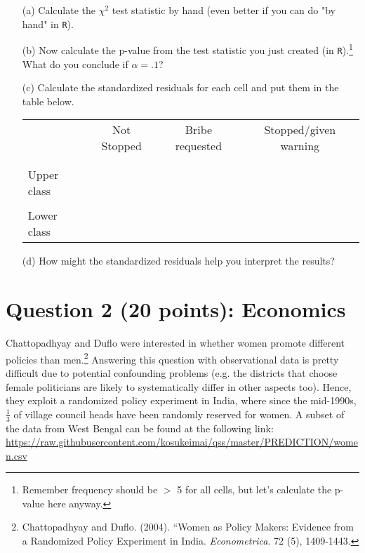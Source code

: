 \documentclass[12pt,letterpaper]{article}
\begin{document}
	\begin{enumerate}
		
		\item [(a)]
		Calculate the $\chi^2$ test statistic by hand (even better if you can do "by hand" in \texttt{R}).\\
		\vspace{7cm}
		
		\item [(b)]
		Now calculate the p-value from the test statistic you just created (in \texttt{R}).\footnote{Remember frequency should be $>$ 5 for all cells, but let's calculate the p-value here anyway.}  What do you conclude if $\alpha = .1$?\\
		
		\newpage
		\item [(c)] Calculate the standardized residuals for each cell and put them in the table below.
		\vspace{1cm}
		
		\begin{table}[h]
			\centering
			\begin{tabular}{l | c c c }
				& Not Stopped & Bribe requested & Stopped/given warning \\
				\\[-1.8ex] 
				\hline \\[-1.8ex]
				Upper class  &  &  &  \\
				\\
				Lower class &  &   &   \\
				
			\end{tabular}
		\end{table}
		
		
		\vspace{7cm}
		\item [(d)] How might the standardized residuals help you interpret the results?  
		
	\end{enumerate}
	\newpage
	
	\section*{Question 2 (20 points): Economics}
	Chattopadhyay and Duflo were interested in whether women promote different policies than men.\footnote{Chattopadhyay and Duflo. (2004). ``Women as Policy Makers: Evidence from a Randomized Policy Experiment in India. \textit{Econometrica}. 72 (5), 1409-1443.} Answering this question with observational data is pretty difficult due to potential confounding problems (e.g. the districts that choose female politicians are likely to systematically differ in other aspects too). Hence, they exploit a randomized policy experiment in India, where since the mid-1990s, $\frac{1}{3}$ of village council heads have been randomly reserved for women. A subset of the data from West Bengal can be found at the following link: \url{https://raw.githubusercontent.com/kosukeimai/qss/master/PREDICTION/women.csv}\\
	
\end{document}
